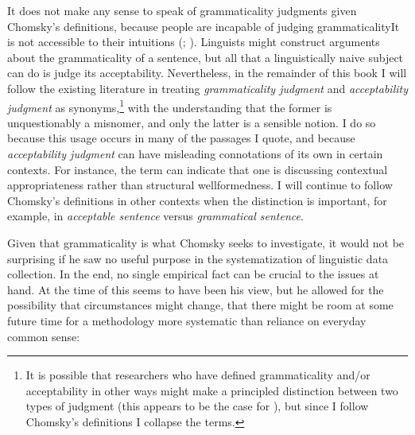 It does not make any sense to speak of grammaticality judgments given Chomsky's definitions, because people are incapable of judging grammaticality\schdash{}It is not accessible to their intuitions (\citet[51]{Newmeyer1983}; \citet{Gombert1992}). Linguists might construct arguments about the grammaticality of a sentence, but all that a linguistically naive subject can do is judge its acceptability. Nevertheless, in the remainder of this book I will follow the existing literature in treating \textit{grammaticality judgment} and \textit{acceptability judgment} as synonyms,\footnote{It is possible that researchers who have defined grammaticality and/or acceptability in other ways might make a principled distinction between two types of judgment (this appears to be the case for \citet{Langendoen1973}), but since I follow Chomsky's definitions I collapse the terms.}
 with the understanding that the former is unquestionably a misnomer, and only the latter is a
sensible notion. I do so because this usage occurs in many of the passages I quote, and because \textit{acceptability judgment} can have misleading connotations of its own in certain contexts. For instance, the term can indicate that one is discussing contextual appropriateness rather than structural wellformedness. I will continue to follow Chomsky's definitions in other contexts when the distinction is important, for example, in \textit{acceptable sentence} versus \textit{grammatical sentence}.

Given that grammaticality is what Chomsky seeks to investigate, it would not be surprising if he saw no useful purpose in the systematization of linguistic data collection. In the end, no single empirical fact can be crucial to the issues at hand. At the time of \citet{Aspects} this seems to have been his view, but he allowed for the possibility that circumstances might change, that there might be room at some future time for a methodology more systematic than reliance on everyday common sense:

